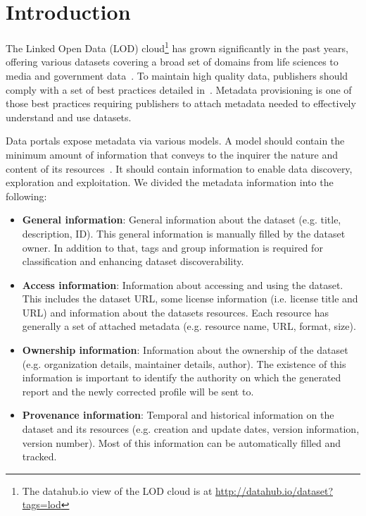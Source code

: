 \documentclass[runningheads,a4paper]{llncs}
\begin{document}
\section{Introduction}
\label{sec:introduction}
The Linked Open Data (LOD) cloud\footnote{The datahub.io view of the LOD cloud is at \url{http://datahub.io/dataset?tags=lod}} has grown significantly in the past years, offering various datasets covering a broad set of domains from life sciences to media and government data~\cite{BizerHeath2009}. To maintain high quality data, publishers should comply with a set of best practices detailed in~\cite{Bizer:2011:EWG:2075914.2075915}. Metadata provisioning is one of those best practices requiring publishers to attach metadata needed to effectively understand and use datasets.

Data portals expose metadata via various models. A model should contain the minimum amount of information that conveys to the inquirer the nature and content of its resources~\cite{nebert2004developing}. It should contain information to enable data discovery, exploration and exploitation. We divided the metadata information into the following:
\begin{itemize}
 \item \textbf{General information}: General information about the dataset (e.g. title, description, ID). This general information is manually filled by the dataset owner. In addition to that, tags and group information is required for classification and enhancing dataset discoverability.
 \item \textbf{Access information}: Information about accessing and using the dataset. This includes the dataset URL, some license information (i.e. license title and URL) and information about the datasets resources. Each resource has generally a set of attached metadata (e.g. resource name, URL, format, size).
 \item \textbf{Ownership information}: Information about the ownership of the dataset (e.g. organization details, maintainer details, author). The existence of this information is important to identify the authority on which the generated report and the newly corrected profile will be sent to.
 \item \textbf{Provenance information}: Temporal and historical information on the dataset and its resources (e.g. creation and update dates, version information, version number). Most of this information can be automatically filled and tracked.
\end{itemize}
\end{document}

